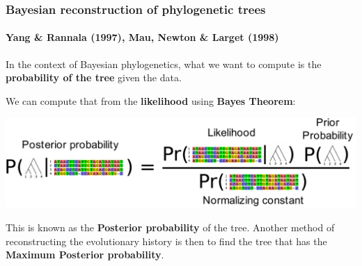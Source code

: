 \begin{frame}[plain]
\frametitle{Bayesian reconstruction of phylogenetic trees}
\framesubtitle{Yang \& Rannala (1997), Mau, Newton \& Larget (1998)}

In the context of Bayesian phylogenetics, what we want to compute is the \textbf{probability of the tree} given the data. 

\medskip{}

We can compute that from the \textbf{likelihood} using \textbf{Bayes Theorem}:

\bigskip{}

\begin{centering}

\includegraphics[width=\textwidth]{../images/PosteriorProbability}

\end{centering}

\medskip{}

This is known as the \textbf{Posterior probability} of the tree. Another method of reconstructing the evolutionary history is then to find the tree that has the \textbf{Maximum Posterior probability}.

\end{frame}
